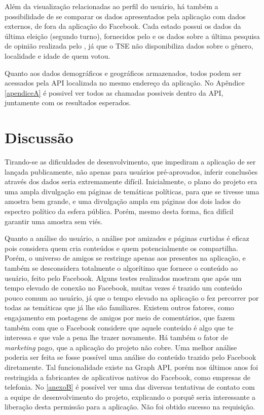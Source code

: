 \documentclass[
	12pt,				%
	oneside,			%
	a4paper,			%
	english,			%
	brazil				%
	]{abntex2ppgsi}
\begin{document}
Além da visualização relacionadas ao perfil do usuário, há também a possibilidade de se comparar os dados apresentados pela aplicação com dados externos, de fora da aplicação do Facebook. Cada estado possui os dados da última eleição (segundo turno), fornecidos pelo  e os dados sobre a última pesquisa de opinião realizada pelo , já que o TSE não disponibiliza dados sobre o gênero, localidade e idade de quem votou. 

Quanto aos dados demográficos e geográficos armazenados, todos podem ser acessados pela API localizada no mesmo endereço da aplicação. No Apêndice \ref{apendiceA} é possivel ver todos as chamadas possiveis dentro da API, juntamente com os resultados esperados. 

\chapter{Discussão}

Tirando-se as dificuldades de desenvolvimento, que impediram a aplicação de ser lançada publicamente, não apenas para usuários pré-aprovados, inferir conclusões através dos dados seria extremamente difícil. Inicialmente, o plano do projeto era uma ampla divulgação em páginas de temáticas políticas, para que se tivesse uma amostra bem grande, e uma divulgação ampla em páginas dos dois lados do espectro político da esfera pública. Porém, mesmo desta forma, fica difícil garantir uma amostra sem viés. 

Quanto a análise do usuário, a análise por amizades e páginas curtidas é eficaz pois considera quem cria conteúdos e quem potencialmente os compartilha. Porém, o universo de amigos se restringe apenas aos presentes na aplicação, e também se desconsidera totalmente o algorítimo que fornece o conteúdo ao usuário, feito pelo Facebook. Alguns testes realizados mostram que após um tempo elevado de conexão no Facebook, muitas vezes é trazido um conteúdo pouco comum ao usuário, já que o tempo elevado na aplicação o fez percorrer por todas as temáticas que já lhe são familiares. Existem outros fatores, como engajamento em postagens de amigos por meio de comentários, que fazem também com que o Facebook considere que aquele conteúdo é algo que te interessa e que vale a pena lhe trazer novamente. Há também o fator de \textit{marketing} pago, que a aplicação do projeto não cobre. Uma melhor análise poderia ser feita se fosse possível uma análise do conteúdo trazido pelo Facebook diretamente. Tal funcionalidade existe na Graph API, porém nos últimos anos foi restringida a fabricantes de aplicativos nativos do Facebook, como empresas de telefonia. No \ref{anexoB} é possível ver uma das diversas tentativas de contato com a equipe de desenvolvimento do projeto, explicando o porquê seria interessante a liberação desta permissão para a aplicação. Não foi obtido sucesso na requisição.
\end{document}
